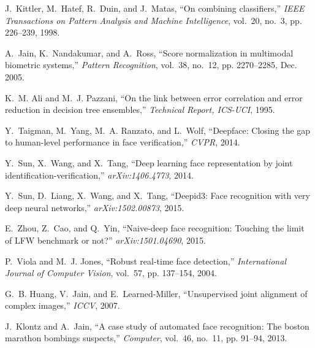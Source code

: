 \documentclass[10pt,journal,compsoc]{IEEEtran}
\begin{document}
\begin{thebibliography}{10}
J.~Kittler, M.~Hatef, R.~Duin, and J.~Matas, ``On combining classifiers,''
  \emph{IEEE Transactions on Pattern Analysis and Machine Intelligence},
  vol.~20, no.~3, pp. 226--239, 1998.

A.~Jain, K.~Nandakumar, and A.~Ross, ``Score normalization in multimodal
  biometric systems,'' \emph{Pattern Recognition}, vol.~38, no.~12, pp.
  2270--2285, Dec. 2005.

K.~M. Ali and M.~J. Pazzani, ``On the link between error correlation and error
  reduction in decision tree ensembles,'' \emph{Technical Report, ICS-UCI},
  1995.

Y.~Taigman, M.~Yang, M.~A. Ranzato, and L.~Wolf, ``Deepface: Closing the gap to
  human-level performance in face verification,'' \emph{CVPR}, 2014.

Y.~Sun, X.~Wang, and X.~Tang, ``Deep learning face representation by joint
  identification-verification,'' \emph{arXiv:1406.4773}, 2014.

Y.~Sun, D.~Liang, X.~Wang, and X.~Tang, ``Deepid3: Face recognition with very
  deep neural networks,'' \emph{arXiv:1502.00873}, 2015.

E.~Zhou, Z.~Cao, and Q.~Yin, ``Naive-deep face recognition: Touching the limit
  of {LFW} benchmark or not?'' \emph{arXiv:1501.04690}, 2015.

P.~Viola and M.~J. Jones, ``Robust real-time face detection,''
  \emph{International Journal of Computer Vision}, vol.~57, pp. 137--154, 2004.

G.~B. Huang, V.~Jain, and E.~Learned-Miller, ``Unsupervised joint alignment of
  complex images,'' \emph{ICCV}, 2007.

J.~Klontz and A.~Jain, ``A case study of automated face recognition: The boston
  marathon bombings suspects,'' \emph{Computer}, vol.~46, no.~11, pp. 91--94,
  2013.

\end{thebibliography}
\end{document}
